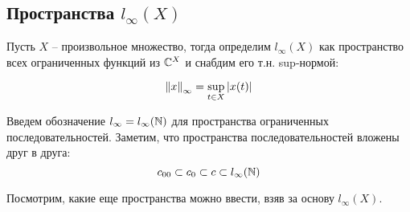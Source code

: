 \documentclass[../main.tex]{subfiles}
\begin{document}
\subsection{Пространства $l_\infty (X)$}

Пусть $X$ -- произвольное множество, тогда определим $l_\infty (X)$ как пространство всех ограниченных функций из $\mathbb{C}^X$ и снабдим его т.н. sup-нормой:

\begin{equation}
	\left\| x \right\|_\infty = \sup_{t \in X}{|x(t)|}
\end{equation}

Введем обозначение $l_\infty = l_\infty (\mathbb{N})$ для пространства ограниченных последовательностей. Заметим, что пространства последовательностей вложены друг в друга:
\begin{equation*}
	c_{00} \subset c_0 \subset c \subset l_\infty (\mathbb{N})
\end{equation*}

Посмотрим, какие еще пространства можно ввести, взяв за основу $l_\infty (X)$.
\end{document}

